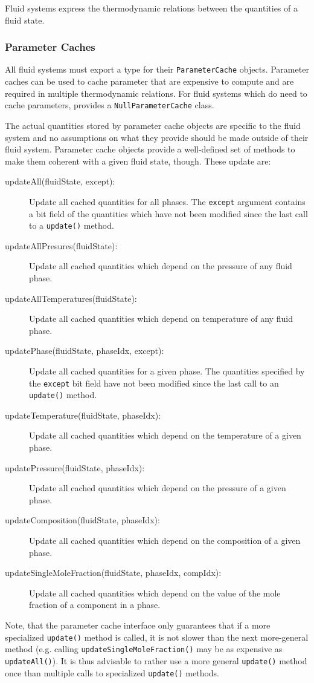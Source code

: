 Fluid systems express the thermodynamic relations between the
quantities of a fluid state.

\subsubsection{Parameter Caches}

All fluid systems must export a type for their \texttt{ParameterCache}
objects. Parameter caches can be used to cache parameter that are
expensive to compute and are required in multiple thermodynamic
relations. For fluid systems which do need to cache parameters,
\Dumux provides a \texttt{NullParameterCache} class.

The actual quantities stored by parameter cache objects are specific
to the fluid system and no assumptions on what they provide should be
made outside of their fluid system. Parameter cache objects provide a
well-defined set of methods to make them coherent with a given fluid
state, though. These update are:
\begin{description}
\item[updateAll(fluidState, except):] Update all cached quantities for
  all phases. The \texttt{except} argument contains a bit field of the
  quantities which have not been modified since the last call to a
  \texttt{update()} method.
\item[updateAllPresures(fluidState):] Update all cached quantities
  which depend on the pressure of any fluid phase.
\item[updateAllTemperatures(fluidState):] Update all cached quantities
  which depend on temperature of any fluid phase.
\item[updatePhase(fluidState, phaseIdx, except):] Update all cached
  quantities for a given phase. The quantities specified by the
  \texttt{except} bit field have not been modified since the last call
  to an \texttt{update()} method.
\item[updateTemperature(fluidState, phaseIdx):] Update all cached
  quantities which depend on the temperature of a given phase.
\item[updatePressure(fluidState, phaseIdx):] Update all cached
  quantities which depend on the pressure of a given phase.
\item[updateComposition(fluidState, phaseIdx):] Update all cached
  quantities which depend on the composition of a given phase.
\item[updateSingleMoleFraction(fluidState, phaseIdx, compIdx):] Update
  all cached quantities which depend on the value of the mole fraction
  of a component in a phase.
\end{description}
Note, that the parameter cache interface only guarantees that if a
more specialized \texttt{update()} method is called, it is not slower
than the next more-general method (e.g. calling
\texttt{updateSingleMoleFraction()} may be as expensive as
\texttt{updateAll()}). It is thus advisable to rather use a more
general \texttt{update()} method once than multiple calls to
specialized \texttt{update()} methods.

